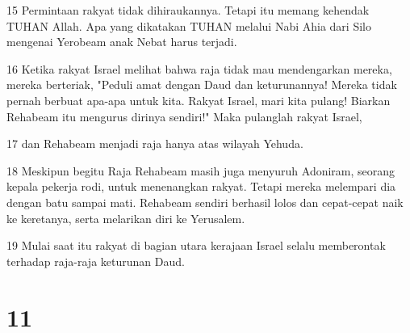 \par 15 Permintaan rakyat tidak dihiraukannya. Tetapi itu memang kehendak TUHAN Allah. Apa yang dikatakan TUHAN melalui Nabi Ahia dari Silo mengenai Yerobeam anak Nebat harus terjadi.
\par 16 Ketika rakyat Israel melihat bahwa raja tidak mau mendengarkan mereka, mereka berteriak, "Peduli amat dengan Daud dan keturunannya! Mereka tidak pernah berbuat apa-apa untuk kita. Rakyat Israel, mari kita pulang! Biarkan Rehabeam itu mengurus dirinya sendiri!" Maka pulanglah rakyat Israel,
\par 17 dan Rehabeam menjadi raja hanya atas wilayah Yehuda.
\par 18 Meskipun begitu Raja Rehabeam masih juga menyuruh Adoniram, seorang kepala pekerja rodi, untuk menenangkan rakyat. Tetapi mereka melempari dia dengan batu sampai mati. Rehabeam sendiri berhasil lolos dan cepat-cepat naik ke keretanya, serta melarikan diri ke Yerusalem.
\par 19 Mulai saat itu rakyat di bagian utara kerajaan Israel selalu memberontak terhadap raja-raja keturunan Daud.

\chapter{11}

